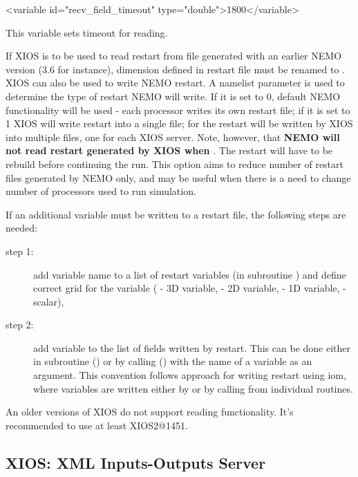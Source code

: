 \documentclass[../main/NEMO_manual]{subfiles}
\begin{document}
\begin{xmllines}
<variable id="recv_field_timeout"        type="double">1800</variable>
\end{xmllines}

This variable sets timeout for reading. 

If XIOS is to be used to read restart from file generated with an earlier NEMO version (3.6 for instance),
dimension  defined in restart file must be renamed to .\\

XIOS can also be used to write NEMO restart. A namelist parameter  is used to determine the 
type of restart NEMO will write. If it is set to 0, default NEMO functionality will be used - each 
processor writes its own restart file; if it is set to 1 XIOS will write restart into a single file; 
for  the restart will be written by XIOS into multiple files, one for each XIOS server. 
Note, however, that \textbf{NEMO will not read restart generated by XIOS when }. The restart will 
have to be rebuild before continuing the run. This option aims to reduce number of restart files generated by NEMO only, 
and may be useful when there is a need to change number of processors used to run simulation. 

If an additional variable must be written to a restart file, the following steps are needed:
\begin{description}
   \item[step 1:] add variable name to a list of restart variables (in subroutine  ) and 
define correct grid for the variable ( - 3D variable,  - 2D variable,  - 
1D variable,  - scalar),
   \item[step 2:] add variable to the list of fields written by restart.  This can be done either in subroutine 
 () or by calling   () with the name of a variable 
as an argument. This convention follows approach for writing restart using iom, where variables are 
written either by  or by calling  from individual routines.
\end{description}


An older versions of XIOS do not support reading functionality. It's recommended to use at least XIOS2@1451.


\subsection{XIOS: XML Inputs-Outputs Server}
\end{document}
